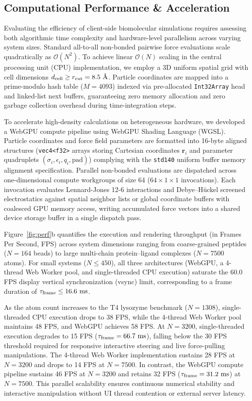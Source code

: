 \documentclass[journal=jpcbfk,manuscript=article,layout=twocolumn]{achemso}
\begin{document}
\subsection{Computational Performance \& Acceleration}
Evaluating the efficiency of client-side biomolecular simulations requires assessing both algorithmic time complexity and hardware-level parallelism across varying system sizes. Standard all-to-all non-bonded pairwise force evaluations scale quadratically as $\mathcal{O}(N^2)$. To achieve linear $\mathcal{O}(N)$ scaling in the central processing unit (CPU) implementation, we employ a 3D uniform spatial grid with cell dimensions $d_{\rm cell} \ge r_{\rm cut} = 8.5\text{ \AA}$. Particle coordinates are mapped into a prime-modulo hash table ($M = 4093$) indexed via pre-allocated \texttt{Int32Array} head and linked-list next buffers, guaranteeing zero memory allocation and zero garbage collection overhead during time-integration steps.

To accelerate high-density calculations on heterogeneous hardware, we developed a WebGPU compute pipeline using WebGPU Shading Language (WGSL). Particle coordinates and force field parameters are formatted into 16-byte aligned structures (\texttt{vec4<f32>} arrays storing Cartesian coordinates $\mathbf{r}_i$ and parameter quadruplets $(\sigma_i, \epsilon_i, q_i, \text{pad})$) complying with the \texttt{std140} uniform buffer memory alignment specification. Parallel non-bonded evaluations are dispatched across one-dimensional compute workgroups of size 64 ($64 \times 1 \times 1$ invocations). Each invocation evaluates Lennard-Jones 12-6 interactions and Debye--H\"uckel screened electrostatics against spatial neighbor lists or global coordinate buffers with coalesced GPU memory access, writing accumulated force vectors into a shared device storage buffer in a single dispatch pass.

Figure~\ref{fig:perf}b quantifies the execution and rendering throughput (in Frames Per Second, FPS) across system dimensions ranging from coarse-grained peptides ($N = 164$ beads) to large multi-chain protein--ligand complexes ($N = 7500$ atoms). For small systems ($N \le 450$), all three architectures (WebGPU, a 4-thread Web Worker pool, and single-threaded CPU execution) saturate the 60.0 FPS display vertical synchronization (vsync) limit, corresponding to a frame duration of $\tau_{\rm frame} \le 16.6\text{ ms}$.

As the atom count increases to the T4 lysozyme benchmark ($N = 1308$), single-threaded CPU execution drops to 38 FPS, while the 4-thread Web Worker pool maintains 48 FPS, and WebGPU achieves 58 FPS. At $N = 3200$, single-threaded execution degrades to 15 FPS ($\tau_{\rm frame} = 66.7\text{ ms}$), falling below the 30 FPS threshold required for responsive interactive steering and live force-pulling manipulations. The 4-thread Web Worker implementation sustains 28 FPS at $N = 3200$ and drops to 14 FPS at $N = 7500$. In contrast, the WebGPU compute pipeline sustains 46 FPS at $N = 3200$ and retains 32 FPS ($\tau_{\rm frame} = 31.2\text{ ms}$) at $N = 7500$. This parallel scalability ensures continuous numerical stability and interactive manipulation without UI thread contention or external server latency.
\end{document}
